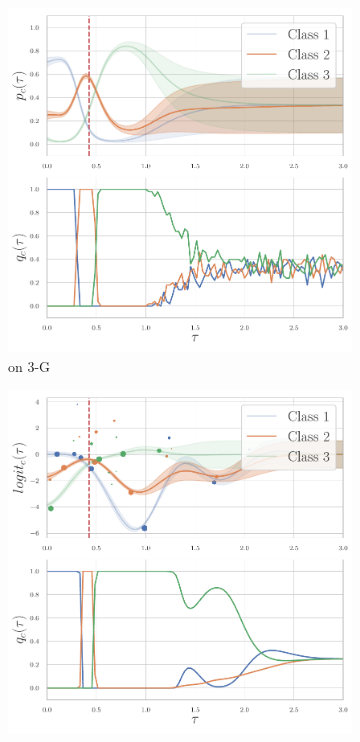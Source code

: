 \begin{figure}
\centering
    \begin{subfigure}{.24\textwidth}
        \centering
        \includegraphics[width=\linewidth]{sections/010_neurips2019/paper/images/shifted-gaussians-dirichlet.pdf}
        \caption*{\DirModel on 3-G}
    \end{subfigure}
    \begin{subfigure}{.24\textwidth}
        \centering
        \includegraphics[width=\linewidth]{sections/010_neurips2019/paper/images/shifted-gaussians-gaussian-process.pdf}

\end{subfigure}
\end{figure}
